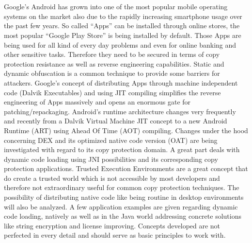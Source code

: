 \chapter*{\abstractname}
Google's Android has grown into one of the most popular mobile operating systems on the market also due to the rapidly increasing smartphone usage
over the past few years. So called ``Apps'' can be installed through
online stores, the most popular ``Google Play Store'' is being installed by default. Those Apps are being used for all kind of every day problems and
even for online banking and other sensitive tasks. Therefore they need
to be secured in terms of copy protection resistance as well as reverse
engineering capabilities. Static and dynamic obfuscation is a common
technique to provide some barriers for attackers. Google's concept of
distributing Apps through machine independent code (Dalvik Executables) and using JIT compiling simplifies the reverse engineering of Apps massively and opens an enormous gate for patching/repackaging. Android's runtime architecture changes very frequently and recently from a Dalvik Virtual Machine JIT concept to a new Android Runtime (ART) using Ahead Of Time (AOT) compiling. Changes under the hood concerning DEX and its optimized native code
version (OAT) are being investigated with regard to its copy protection domain.
A great part deals with dynamic code loading using JNI possibilities and its
corresponding copy protection applications. Trusted Execution Environments
are a great concept that do create a trusted world which is not accessible
by most developers and therefore not extraordinary useful for common copy
protection techniques. The possibility of distributing native code like
being routine in desktop environments will also be analyzed. A few application
examples are given regarding dynamic code loading, natively as well as in the Java world addressing concrete solutions like string encryption and license
improving. Concepts developed are not perfected in every detail and should
serve as basic principles to work with.
